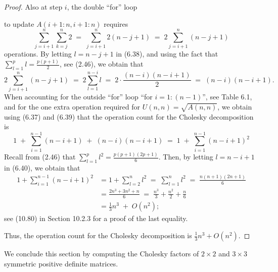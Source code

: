 \begin{proof}
Also at step $i$, the double ``for'' loop
\begin{center}
\end{center}
to update $A(i+1:n,i+1:n)$ requires
\begin{equation}
\sum_{j=i+1}^{n}\sum_{k=j}^{n} 2 \;=\; \sum_{j=i+1}^{n} 2(n-j+1) \;=\; 2\sum_{j=i+1}^{n}(n-j+1)
\end{equation}
operations. By letting $l = n-j+1$ in (6.38), and using the fact that
$\sum_{l=1}^{p} l = \frac{p(p+1)}{2}$, see (2.46), we obtain that
\begin{equation}
2\sum_{j=i+1}^{n}(n-j+1) \;=\; 2\sum_{l=1}^{n-i} l \;=\; 2\cdot\frac{(n-i)(n-i+1)}{2}
\;=\; (n-i)(n-i+1).
\end{equation}
When accounting for the outside ``for'' loop ``for $i = 1:(n-1)$'', see Table 6.1, and
for the one extra operation required for $U(n,n) = \sqrt{A(n,n)}$, we obtain using
(6.37) and (6.39) that the operation count for the Cholesky decomposition is
\begin{equation}
1 \;+\; \sum_{i=1}^{n-1}(n-i+1) \;+\; (n-i)(n-i+1) \;=\; 1 \;+\; \sum_{i=1}^{n-1}(n-i+1)^2
\end{equation}
Recall from (2.46) that $\sum_{l=1}^{p} l^2 = \frac{p(p+1)(2p+1)}{6}$. Then, by letting
$l = n-i+1$ in (6.40), we obtain that
\begin{align*}
1 + \sum_{i=1}^{n-1}(n-i+1)^2 &= 1 + \sum_{l=2}^{n} l^2 \;=\; \sum_{l=1}^{n} l^2
\;=\; \frac{n(n+1)(2n+1)}{6} \\
&= \frac{2n^3+3n^2+n}{6} \;=\; \frac{n^3}{3}+\frac{n^2}{2}+\frac{n}{6} \\
&= \frac{1}{3}n^3 \;+\; O(n^2);
\end{align*}
see (10.80) in Section 10.2.3 for a proof of the last equality.

Thus, the operation count for the Cholesky decomposition is $\frac{1}{3}n^3 + O(n^2)$.
\end{proof}

We conclude this section by computing the Cholesky factors of $2 \times 2$ and
$3 \times 3$ symmetric positive definite matrices.

